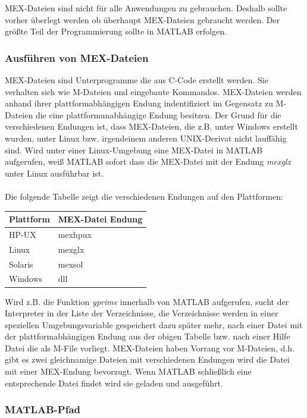 \documentclass[10pt, bigheadings]{scrartcl}
\begin{document}
MEX-Dateien sind nicht für alle Anwendungen zu gebrauchen. Deshalb
sollte vorher überlegt werden ob überhaupt MEX-Dateien gebraucht
werden. Der größte Teil der Programmierung sollte in MATLAB erfolgen.

\subsubsection*{Ausführen von MEX-Dateien}
MEX-Dateien sind Unterprogramme die aus C-Code erstellt werden. Sie
verhalten sich wie M-Dateien und eingebaute Kommandos. MEX-Dateien
werden anhand ihrer plattformabhängigen Endung indentifiziert im
Gegensatz zu M-Dateien die eine plattformunabhängige Endung besitzen. 
Der Grund für die verschiedenen Endungen ist, dass
MEX-Dateien, die z.B. unter Windows erstellt wurden, unter Linux bzw.
irgendeinem anderen UNIX-Derivat nicht lauffähig sind. Wird unter
einer Linux-Umgebung eine MEX-Datei in MATLAB aufgerufen, weiß
MATLAB sofort dass die MEX-Datei mit der Endung \textit{mexglx}
unter Linux ausführbar ist.\\\\
Die folgende Tabelle zeigt die verschiedenen Endungen auf den
Plattformen:
\begin{center}
\begin{tabular}{|l|l|}
\hline
\textbf{Plattform} & \textbf{MEX-Datei Endung}\\
\hline
HP-UX & mexhpux\\
\hline
Linux & mexglx\\
\hline
Solaris & mexsol\\
\hline
Windows & dll\\
\hline
\end{tabular}
\end{center}
Wird z.B. die Funktion \textit{yprime} innerhalb von MATLAB aufgerufen, sucht
der Interpreter in der Liste der Verzeichnisse, die Verzeichnisse werden in
einer speziellen Umgebungsvariable gespeichert dazu später mehr, nach einer
Datei mit der plattformabhängigen Endung aus der obigen Tabelle bzw. nach einer 
Hilfe Datei die als M-File vorliegt. MEX-Dateien haben Vorrang vor M-Dateien,
d.h. gibt es zwei gleichnamige Dateien mit verschiedenen Endungen wird die
Datei mit einer MEX-Endung bevorzugt. Wenn MATLAB schließlich eine
entsprechende Datei findet wird sie geladen und ausgeführt.

\subsubsection*{MATLAB-Pfad}
\end{document}
